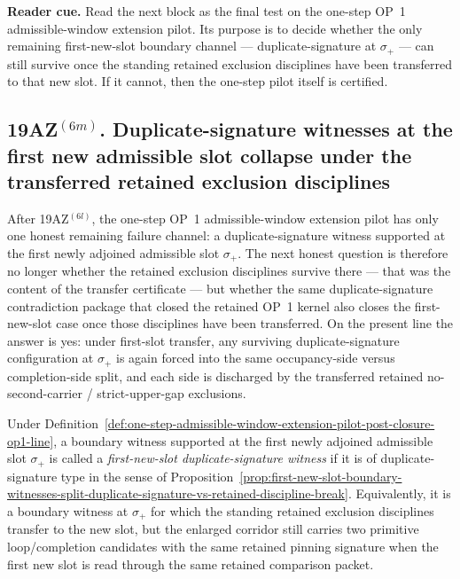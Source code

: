 \noindent\textbf{Reader cue.} Read the next block as the final test on the one-step OP~1 admissible-window extension pilot. Its purpose is to decide whether the only remaining first-new-slot boundary channel --- duplicate-signature at $\sigma_{+}$ --- can still survive once the standing retained exclusion disciplines have been transferred to that new slot. If it cannot, then the one-step pilot itself is certified.

\subsection*{19AZ$^{(6m)}$. Duplicate-signature witnesses at the first new admissible slot collapse under the transferred retained exclusion disciplines}
\label{sec:duplicate-signature-witnesses-first-new-slot-collapse-under-transferred-retained-exclusion-disciplines}
After 19AZ$^{(6l)}$, the one-step OP~1 admissible-window extension pilot has only one honest remaining failure channel: a duplicate-signature witness supported at the first newly adjoined admissible slot $\sigma_{+}$. The next honest question is therefore no longer whether the retained exclusion disciplines survive there --- that was the content of the transfer certificate --- but whether the same duplicate-signature contradiction package that closed the retained OP~1 kernel also closes the first-new-slot case once those disciplines have been transferred. On the present line the answer is yes: under first-slot transfer, any surviving duplicate-signature configuration at $\sigma_{+}$ is again forced into the same occupancy-side versus completion-side split, and each side is discharged by the transferred retained no-second-carrier / strict-upper-gap exclusions.

\begin{definition}
\label{def:first-new-slot-duplicate-signature-witness-one-step-op1-extension-pilot}
Under Definition~\ref{def:one-step-admissible-window-extension-pilot-post-closure-op1-line}, a boundary witness supported at the first newly adjoined admissible slot $\sigma_{+}$ is called a \emph{first-new-slot duplicate-signature witness} if it is of duplicate-signature type in the sense of Proposition~\ref{prop:first-new-slot-boundary-witnesses-split-duplicate-signature-vs-retained-discipline-break}. Equivalently, it is a boundary witness at $\sigma_{+}$ for which the standing retained exclusion disciplines transfer to the new slot, but the enlarged corridor still carries two primitive loop/completion candidates with the same retained pinning signature when the first new slot is read through the same retained comparison packet.
\end{definition}

